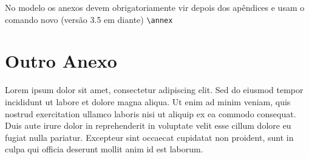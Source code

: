 \documentclass[dsc,setavermelha,numeracaoporcapitulo,linhanafolhaderosto]{ufrj}
\theoremstyle{plain}
\theoremstyle{definition}
\theoremstyle{remark}
\begin{document}
No modelo \CoppeTeX{} os anexos devem obrigatoriamente vir depois dos apêndices e usam o comando novo (versão 3.5 em diante) \verb|\annex|

\chapter{Outro Anexo}

Lorem ipsum dolor sit amet, consectetur adipiscing elit. Sed do eiusmod tempor incididunt ut labore et dolore magna aliqua. Ut enim ad minim veniam, quis nostrud exercitation ullamco laboris nisi ut aliquip ex ea commodo consequat. Duis aute irure dolor in reprehenderit in voluptate velit esse cillum dolore eu fugiat nulla pariatur. Excepteur sint occaecat cupidatat non proident, sunt in culpa qui officia deserunt mollit anim id est laborum.

\renewcommand{\indexname}{Índice de Assuntos}
\printindex

\ufrjfinalpage%
\end{document}
